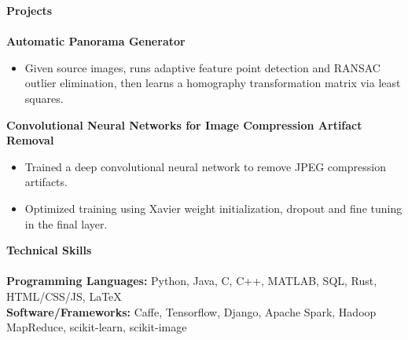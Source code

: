 \documentclass{article}
\begin{document}
\noindent
\textbf{\Large Projects}\\[-2mm]
\HRule\\
\textbf{Automatic Panorama Generator} 
\begin{itemize}
\vspace{-2.5mm}
\item Given source images, runs adaptive feature point detection and RANSAC outlier elimination, then learns a homography transformation matrix via least squares.
\end{itemize}
\vspace{-2mm}
\noindent
\textbf{Convolutional Neural Networks for Image Compression Artifact Removal}
\begin{itemize}
\vspace{-2.5mm}
\item Trained a deep convolutional neural network to remove JPEG compression artifacts.
\vspace{-2.5mm}
\item Optimized training using Xavier weight initialization, dropout and fine tuning in the final layer.
\end{itemize}

\noindent
\textbf{\Large Technical Skills}\\[-2mm]
\HRule\\
\textbf{Programming Languages:} Python, Java, C, C++, MATLAB, SQL, Rust, HTML/CSS/JS, \LaTeX \\
\textbf{Software/Frameworks:} Caffe, Tensorflow, Django, Apache Spark, Hadoop MapReduce, scikit-learn, scikit-image


\end{document}
